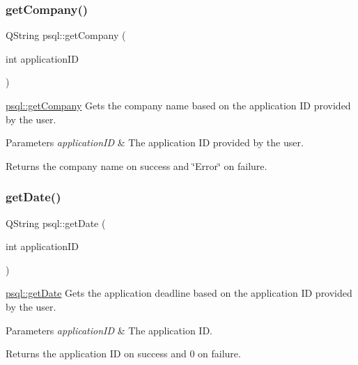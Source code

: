 \subsubsection{\texorpdfstring{get\+Company()}{getCompany()}}
{\footnotesize\ttfamily Q\+String psql\+::get\+Company (\begin{DoxyParamCaption}\item[{int}]{application\+ID }\end{DoxyParamCaption})}



\hyperlink{classpsql_a09745cd03f09ffb2dacacaab4281915f}{psql\+::get\+Company} Gets the company name based on the application ID provided by the user. 


\begin{DoxyParams}{Parameters}
{\em application\+ID} & The application ID provided by the user. \\
\hline
\end{DoxyParams}
\begin{DoxyReturn}{Returns}
the company name on success and \char`\"{}\+Error\char`\"{} on failure. 
\end{DoxyReturn}
\mbox{\label{classpsql_a561f96bfe7e9d092077712dd6b186af8}} 
\subsubsection{\texorpdfstring{get\+Date()}{getDate()}}
{\footnotesize\ttfamily Q\+String psql\+::get\+Date (\begin{DoxyParamCaption}\item[{int}]{application\+ID }\end{DoxyParamCaption})}



\hyperlink{classpsql_a561f96bfe7e9d092077712dd6b186af8}{psql\+::get\+Date} Gets the application deadline based on the application ID provided by the user. 


\begin{DoxyParams}{Parameters}
{\em application\+ID} & The application ID. \\
\hline
\end{DoxyParams}
\begin{DoxyReturn}{Returns}
the application ID on success and 0 on failure. 
\end{DoxyReturn}
\mbox{\label{classpsql_a95d06ee661db0b9cf72605b983b04613}} 
